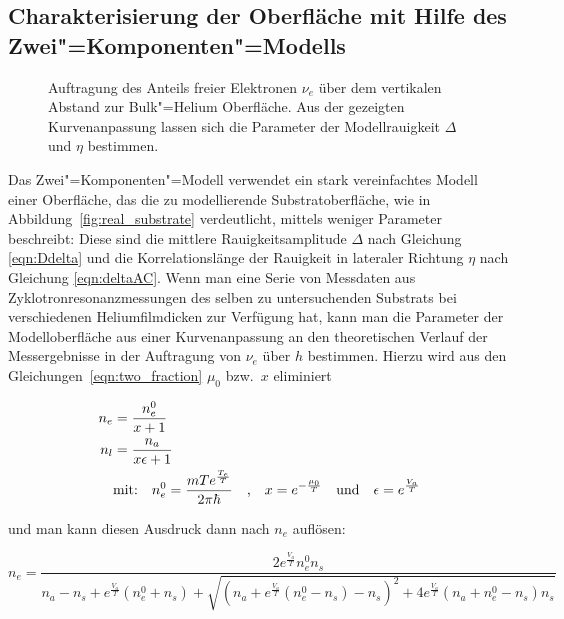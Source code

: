 \subsection{Charakterisierung der Oberfläche mit Hilfe des Zwei"=Komponenten"=Modells}

\begin{figure}[h!tbp]
	\hfill%
	\begin{minipage}[b]{\textwidth-\tabcolsep-\smidwidth}
		\caption[Ergebnisse des Zwei"=Komponenten"=Modells]{Auftragung des Anteils freier Elektronen $\nu_e$ über dem vertikalen Abstand zur Bulk"=Helium Oberfläche. Aus der gezeigten Kurvenanpassung lassen sich die Parameter der Modellrauigkeit $\Delta$ und $\eta$ bestimmen.}
		\label{fig:filmcr_res2}
	\end{minipage}
\end{figure}

Das Zwei"=Komponenten"=Modell verwendet ein stark vereinfachtes Modell einer Oberfläche, das die zu modellierende Substratoberfläche, wie in Abbildung~\ref{fig:real_substrate} verdeutlicht, mittels weniger Parameter beschreibt: Diese sind die mittlere Rauigkeitsamplitude $\Delta$ nach Gleichung \eqref{eqn:Ddelta} und die Korrelationslänge der Rauigkeit in lateraler Richtung $\eta$ nach Gleichung \eqref{eqn:deltaAC}. Wenn man eine Serie von Messdaten aus Zyklotronresonanzmessungen des selben zu untersuchenden Substrats bei verschiedenen Heliumfilmdicken zur Verfügung hat, kann man die Parameter der Modelloberfläche aus einer Kurvenanpassung an den theoretischen Verlauf der Messergebnisse in der Auftragung von $\nu_e$ über $h$ bestimmen. Hierzu wird aus den Gleichungen~\eqref{eqn:two_fraction} $\mu_0$ bzw.\ $x$ eliminiert

\begin{equation}
	\begin{aligned}
	n_e &= \frac{n_e^0}{x + 1}\\
	n_l &= \frac{n_a}{x\epsilon + 1}\\
	&\text{mit:}\quad n_e^0=\frac{m T e^{\frac{T_e}{T}}}{2\pi\hbar}\quad\text{,}\quad
		x=e^{-\frac{\mu_0}{T}}\quad\text{und}\quad\epsilon=e^{\frac{V_a}{T}}
	\end{aligned}
\end{equation}
 
 und man kann diesen Ausdruck dann nach $n_e$ auflösen:
 
 \begin{equation}
 	\label{eqn:neh}
 	n_e=\frac{2e^\frac{V_a}{T}n_e^0 n_s}{n_a - n_s + e^\frac{V_a}{T} (n_e^0 + n_s) +
	\sqrt{\left(n_a + e^\frac{V_a}{T} (n_e^0 - n_s) - n_s\right)^2 +
	 4e^\frac{V_a}{T}(n_a + n_e^0 - n_s)n_s}}
 \end{equation}
 

